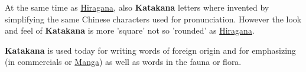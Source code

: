 

At the same time as \hyperref[sec:Hiragana]{Hiragana}, also \textbf{Katakana}
letters where invented by simplifying the same Chinese characters used for
pronunciation. However the look and feel of \textbf{Katakana} is more 'square'
not so 'rounded' as \hyperref[sec:Hiragana]{Hiragana}.

\textbf{Katakana} is used today for writing words of foreign origin and for
emphasizing (in commercials or \hyperref[sec:Manga]{Manga}) as well as words in
the fauna or flora.

